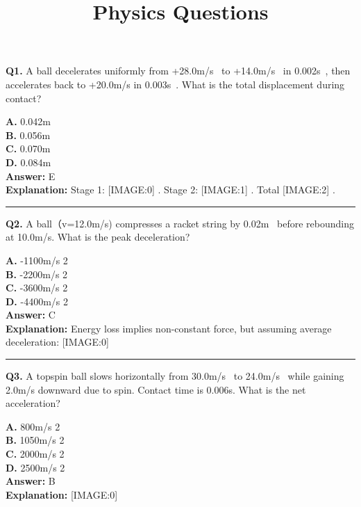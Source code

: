 \documentclass[12pt]{article}
\title{{\Huge Physics Questions}}
\date{}
\begin{document}
\maketitle
\setlength{\parskip}{0.5em}


\noindent
\textbf{Q1.} A ball decelerates uniformly from +28.0m/s  to +14.0m/s  in 0.002s , then accelerates back to +20.0m/s in 0.003s .
What is the total displacement during contact?



\textbf{A.} 0.042m \\
\textbf{B.} 0.056m \\
\textbf{C.} 0.070m \\
\textbf{D.} 0.084m \\

\textbf{Answer:} E \\
\textbf{Explanation:} Stage 1:
[IMAGE:0]
. Stage 2:
[IMAGE:1]
. Total
[IMAGE:2]
.

\hrule
\vspace{1em}


\noindent
\textbf{Q2.} A ball（v=12.0m/s) compresses a racket string by 0.02m  before rebounding at 10.0m/s.
What is the peak deceleration?



\textbf{A.} -1100m/s
2 \\
\textbf{B.} -2200m/s
2 \\
\textbf{C.} -3600m/s
2 \\
\textbf{D.} -4400m/s
2 \\

\textbf{Answer:} C \\
\textbf{Explanation:} Energy loss implies non-constant force, but assuming average deceleration:
[IMAGE:0]

\hrule
\vspace{1em}


\noindent
\textbf{Q3.} A topspin ball slows horizontally from 30.0m/s  to 24.0m/s  while gaining 2.0m/s downward due to spin. Contact time is 0.006s.
What is the net acceleration?



\textbf{A.} 800m/s
2 \\
\textbf{B.} 1050m/s
2 \\
\textbf{C.} 2000m/s
2 \\
\textbf{D.} 2500m/s
2 \\

\textbf{Answer:} B \\
\textbf{Explanation:} [IMAGE:0]
\end{document}
